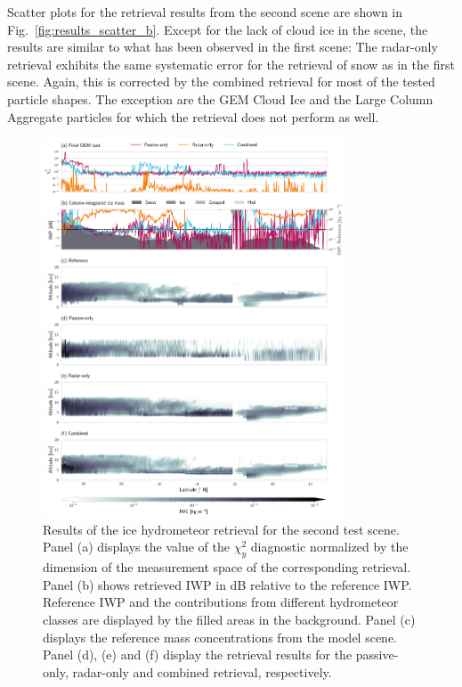 \documentclass[journal abbreviation, manuscript]{copernicus}
\begin{document}
Scatter plots for the retrieval results from the second scene are shown in
Fig.~\ref{fig:results_scatter_b}. Except for the lack of cloud ice in the scene,
the results are similar to what has been observed in the first scene: The
radar-only retrieval exhibits the same systematic error for the retrieval of snow as in
the first scene. Again, this is corrected by the combined retrieval for most of
the tested particle shapes. The exception are the GEM Cloud Ice and the Large
Column Aggregate particles for which the retrieval does not perform as well.

\clearpage

\begin{figure}
\centering
\includegraphics[width = 0.8\textwidth]{../plots/results_b_LargePlateAggregate}
\caption{Results of the ice hydrometeor retrieval for the second test scene.
  Panel (a) displays the value of the $\chi^2_y$ diagnostic normalized by the
  dimension of the measurement space of the corresponding retrieval. Panel (b)
  shows retrieved IWP in dB relative to the reference IWP. Reference IWP and the
  contributions from different hydrometeor classes are displayed by the filled
  areas in the background. Panel (c) displays the reference mass concentrations
  from the model scene. Panel (d), (e) and (f) display the retrieval results for
  the passive-only, radar-only and combined retrieval, respectively.}
\label{fig:results_b}
\end{figure}
\end{document}
